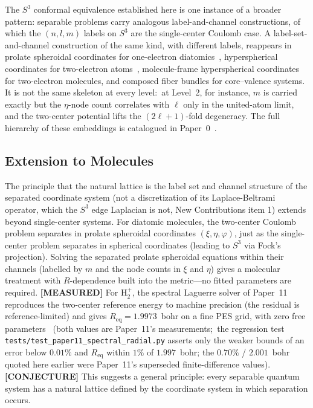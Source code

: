 \documentclass[aps,pra,twocolumn,superscriptaddress,longbibliography]{revtex4-2}
\newcommand{\gvq}[2]{#2}
\newcommand{\gvc}[2]{#2}
\begin{document}
The $S^3$ conformal equivalence established here is one instance of a broader pattern: separable problems carry analogous label-and-channel constructions, of which the $(n, l, m)$ labels on $S^3$ are the single-center Coulomb case.  A label-set-and-channel construction of the same kind, with different labels, reappears in prolate spheroidal coordinates for one-electron diatomics~\cite{loutey_paper11}, hyperspherical coordinates for two-electron atoms~\cite{loutey_paper13}, molecule-frame hyperspherical coordinates for two-electron molecules, and composed fiber bundles for core--valence systems.  It is not the same skeleton at every level:\ at Level~2, for instance, $m$ is carried exactly but the $\eta$-node count correlates with $\ell$ only in the united-atom limit, and the two-center potential lifts the $(2\ell+1)$-fold degeneracy.  The full hierarchy of these embeddings is catalogued in Paper~0~\cite{loutey_paper0}.

\subsection{Extension to Molecules}

The principle that the natural lattice is the label set and channel structure of the separated coordinate system (\gvc{graph-s3-wall}{not a discretization of its Laplace-Beltrami operator, which the $S^3$ edge Laplacian is not, New Contributions item 1}) extends beyond single-center systems.  For diatomic molecules, the two-center Coulomb problem separates in prolate spheroidal coordinates $(\xi, \eta, \varphi)$, just as the single-center problem separates in spherical coordinates (leading to $S^3$ via Fock's projection).  Solving the separated prolate spheroidal equations within their channels (labelled by $m$ and the node counts in $\xi$ and $\eta$) gives a molecular treatment with $R$-dependence built into the metric---no fitted parameters are required.  \textbf{[MEASURED]} For H$_2^+$, the spectral Laguerre solver of Paper~11 reproduces the two-center reference energy to machine precision (the residual is reference-limited) and gives $R_{\mathrm{eq}} = \gvq{p11_h2plus_req_bohr}{1.9973}$~bohr on a fine PES grid, with zero free parameters~\cite{loutey_paper11} (both values are Paper~11's measurements;\ the regression test \texttt{tests/test\_paper11\_spectral\_radial.py} asserts only the weaker bounds of an error below $0.01\%$ and $R_{\mathrm{eq}}$ within $1\%$ of $1.997$~bohr; the $0.70\%$ / $2.001$~bohr quoted here earlier were Paper~11's superseded finite-difference values).  \textbf{[CONJECTURE]} This suggests a general principle: every separable quantum system has a natural lattice defined by the coordinate system in which separation occurs.
\end{document}

